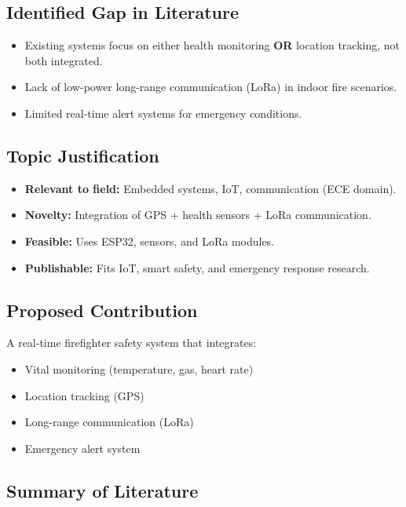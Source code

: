 \documentclass[12pt,a4paper]{article}
\begin{document}
	\subsection{Identified Gap in Literature}
	\begin{itemize}
		\item Existing systems focus on either health monitoring \textbf{OR} location tracking, not both integrated.
		\item Lack of low-power long-range communication (LoRa) in indoor fire scenarios.
		\item Limited real-time alert systems for emergency conditions.
	\end{itemize}
	
	\subsection{Topic Justification}
	\begin{itemize}
		\item \textbf{Relevant to field:} Embedded systems, IoT, communication (ECE domain).
		\item \textbf{Novelty:} Integration of GPS + health sensors + LoRa communication.
		\item \textbf{Feasible:} Uses ESP32, sensors, and LoRa modules.
		\item \textbf{Publishable:} Fits IoT, smart safety, and emergency response research.
	\end{itemize}
	
	\subsection{Proposed Contribution}
	A real-time firefighter safety system that integrates:
	\begin{itemize}
		\item Vital monitoring (temperature, gas, heart rate)
		\item Location tracking (GPS)
		\item Long-range communication (LoRa)
		\item Emergency alert system
	\end{itemize}
	
	\subsection{Summary of Literature}
	
\end{document}
